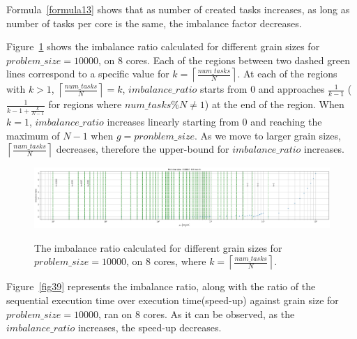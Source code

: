 Formula~\ref{formula13} shows that as number of created tasks increases, as long as number of tasks per core is the same, the imbalance factor decreases. 

\vspace{\baselineskip}

Figure~\ref{fig38} shows the imbalance ratio calculated for different grain sizes for $problem\_size=10000$, on 8 cores. Each of the regions between two dashed green lines correspond to a specific value for $k=\left\lceil{\frac{num\_{tasks}}{N}}\right \rceil$. 
At each of the regions with $k>1$, $\left\lceil{\frac{num\_{tasks}}{N}}\right \rceil=k$,  $imbalance\_{ratio}$ starts from $0$ and approaches $\frac{1}{k-1}$ ($\frac{1}{k-1+\frac{k}{N-1}}$ for regions where $num\_{tasks}\%{N}\neq{1}$) at the end of the region. When $k=1$, $imbalance\_{ratio}$ increases linearly starting from 0 and reaching the maximum of $N-1$ when $g=pronblem\_{size}$. As we move to larger grain sizes, $\left\lceil{\frac{num\_{tasks}}{N}}\right \rceil$ decreases, therefore the upper-bound for $imbalance\_{ratio}$ increases.   


\vspace{\baselineskip}	
\begin{figure}[H]
	\centering
	{\includegraphics[scale=.25]{images/hpx_for_loop/w_c_all.png}}
	\caption{The imbalance ratio calculated for different grain sizes for $problem\_size=10000$, on 8 cores, where $k=\left\lceil{\frac{num\_{tasks}}{N}}\right \rceil$.}\label{fig38}		
\end{figure}



Figure~\ref{fig39} represents the imbalance ratio, along with the ratio of the sequential execution time over execution time(speed-up) against grain size for $problem\_size=10000$, ran on 8 cores.   
As it can be observed, as the $imbalance\_{ratio}$ increases, the speed-up decreases. 

